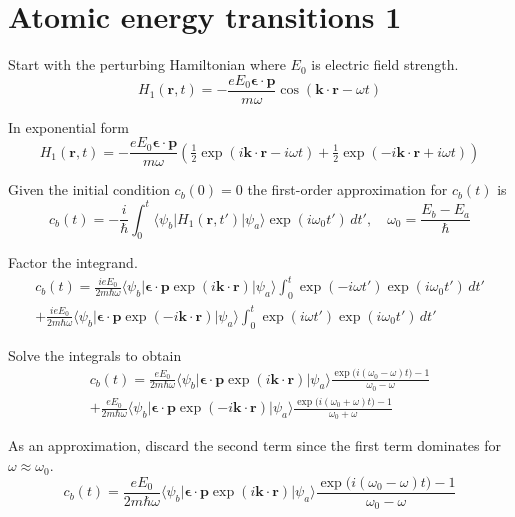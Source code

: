 

\section*{Atomic energy transitions 1}

Start with the perturbing Hamiltonian where $E_0$ is electric field strength.
\begin{equation*}
H_1(\mathbf r,t)=-\frac{eE_0\boldsymbol{\epsilon}\cdot\mathbf p}{m\omega}
\cos(\mathbf k\cdot\mathbf r-\omega t)
\end{equation*}

In exponential form
\begin{equation*}
H_1(\mathbf r,t)=-\frac{eE_0\boldsymbol{\epsilon}\cdot\mathbf p}{m\omega}
\left(\tfrac{1}{2}\exp(i\mathbf k\cdot\mathbf r-i\omega t)
+\tfrac{1}{2}\exp(-i\mathbf k\cdot\mathbf r+i\omega t)\right)
\end{equation*}

Given the initial condition $c_b(0)=0$ the first-order approximation for $c_b(t)$ is
\begin{equation*}
c_b(t)=-\frac{i}{\hbar}\int_0^t
\langle\psi_b|H_1(\mathbf r,t')|\psi_a\rangle\exp(i\omega_0t')\,dt',\quad
\omega_0=\frac{E_b-E_a}{\hbar}
\end{equation*}

Factor the integrand.
\begin{multline*}
c_b(t)
=\frac{ieE_0}{2m\hbar\omega}
\langle\psi_b|\boldsymbol{\epsilon}\cdot\mathbf p\exp(i\mathbf k\cdot\mathbf r)|\psi_a\rangle
\int_0^t\exp(-i\omega t')\exp(i\omega_0t')\,dt'
\\
+\frac{ieE_0}{2m\hbar\omega}
\langle\psi_b|\boldsymbol{\epsilon}\cdot\mathbf p\exp(-i\mathbf k\cdot\mathbf r)|\psi_a\rangle
\int_0^t\exp(i\omega t')\exp(i\omega_0t')\,dt'
\end{multline*}

Solve the integrals to obtain
\begin{multline*}
c_b(t)=\frac{eE_0}{2m\hbar\omega}
\langle\psi_b|\boldsymbol{\epsilon}\cdot\mathbf p\exp(i\mathbf k\cdot\mathbf r)|\psi_a\rangle
\frac{\exp\bigl(i(\omega_0-\omega)t\bigr)-1}{\omega_0-\omega}
\\
+\frac{eE_0}{2m\hbar\omega}
\langle\psi_b|\boldsymbol{\epsilon}\cdot\mathbf p\exp(-i\mathbf k\cdot\mathbf r)|\psi_a\rangle
\frac{\exp\bigl(i(\omega_0+\omega)t\bigr)-1}{\omega_0+\omega}
\tag{1}
\end{multline*}

As an approximation, discard the second term since the first term
dominates for $\omega\approx\omega_0$.
\begin{equation*}
c_b(t)=\frac{eE_0}{2m\hbar\omega}
\langle\psi_b|\boldsymbol{\epsilon}\cdot\mathbf p\exp(i\mathbf k\cdot\mathbf r)|\psi_a\rangle
\frac{\exp\bigl(i(\omega_0-\omega)t\bigr)-1}{\omega_0-\omega}
\end{equation*}

